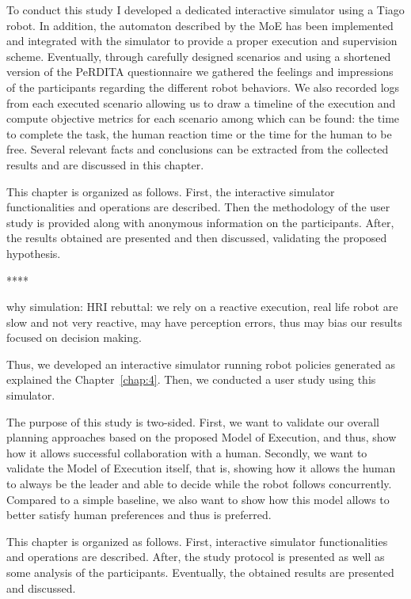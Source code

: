 To conduct this study I developed a dedicated interactive simulator using a Tiago robot. In addition, the automaton described by the MoE has been implemented and integrated with the simulator to provide a proper execution and supervision scheme. Eventually, through carefully designed scenarios and using a shortened version of the PeRDITA questionnaire we gathered the feelings and impressions of the participants regarding the different robot behaviors. We also recorded logs from each executed scenario allowing us to draw a timeline of the execution and compute objective metrics for each scenario among which can be found: the time to complete the task, the human reaction time or the time for the human to be free. Several relevant facts and conclusions can be extracted from the collected results and are discussed in this chapter.

This chapter is organized as follows. First, the interactive simulator functionalities and operations are described. Then the methodology of the user study is provided along with anonymous information on the participants. After, the results obtained are presented and then discussed, validating the proposed hypothesis.

****

why simulation: HRI rebuttal: we rely on a reactive execution, real life robot are slow and not very reactive, may have perception errors, thus may bias our results focused on decision making.

Thus, we developed an interactive simulator running robot policies generated as explained the Chapter~\ref{chap:4}. Then, we conducted a user study using this simulator.

The purpose of this study is two-sided. First, we want to validate our overall planning approaches based on the proposed Model of Execution, and thus, show how it allows successful collaboration with a human. Secondly, we want to validate the Model of Execution itself, that is, showing how it allows the human to always be the leader and able to decide while the robot follows concurrently. Compared to a simple baseline, we also want to show how this model allows to better satisfy human preferences and thus is preferred. 

This chapter is organized as follows. First, interactive simulator functionalities and operations are described. After, the study protocol is presented as well as some analysis of the participants. Eventually, the obtained results are presented and discussed.

